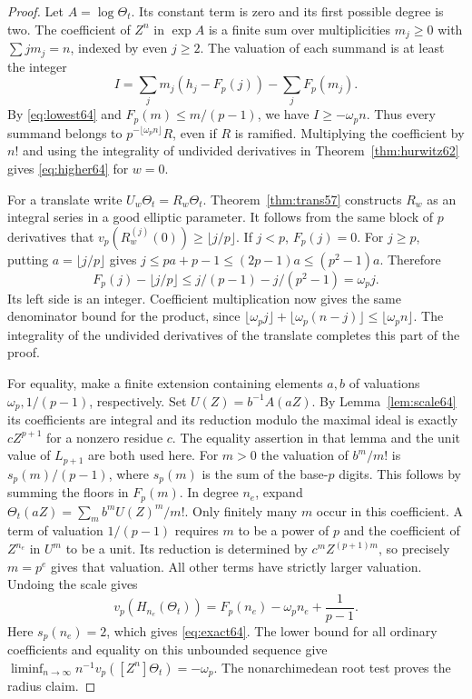 \documentclass[a4paper,11pt]{article}
\theoremstyle{definition}
\theoremstyle{remark}
\numberwithin{equation}{section}
\begin{document}
\begin{proof}
Let \(A=\log\Theta_t\). Its constant term is zero and its first
possible degree is two. The coefficient of \(Z^n\) in \(\exp A\)
is a finite sum over multiplicities \(m_j\ge0\) with
\(\sum j m_j=n\), indexed by even \(j\ge2\). The valuation of
each summand is at least the integer
\[
     I=\sum_j m_j(h_j-F_p(j))-\sum_j F_p(m_j).
\]
By \eqref{eq:lowest64} and \(F_p(m)\le m/(p-1)\), we have
\(I\ge-\omega_p n\). Thus every summand belongs to
\(p^{-\lfloor\omega_p n\rfloor}R\), even if \(R\) is ramified.
Multiplying the coefficient by \(n!\) and using the integrality
of undivided derivatives in Theorem~\ref{thm:hurwitz62} gives
\eqref{eq:higher64} for \(w=0\).

For a translate write \(U_w\Theta_t=R_w\Theta_t\).
Theorem~\ref{thm:trans57}
constructs \(R_w\) as an integral series in a good elliptic parameter.
It follows from the same block of \(p\) derivatives that
\(v_p(R_w^{(j)}(0))\ge\lfloor j/p\rfloor\).
If \(j<p\), \(F_p(j)=0\). For \(j\ge p\), putting \(a=\lfloor j/p\rfloor\)
gives \(j\le pa+p-1\le (2p-1)a\le(p^2-1)a\). Therefore
\[
 F_p(j)-\lfloor j/p\rfloor
       \le j/(p-1)-j/(p^2-1)=\omega_p j .
\]
Its left side is an integer. Coefficient multiplication now gives the
same denominator bound for the product, since
\(\lfloor\omega_p j\rfloor+\lfloor\omega_p(n-j)\rfloor
\le\lfloor\omega_p n\rfloor\). The integrality of the undivided
derivatives of the translate completes this part of the proof.

For equality, make a finite extension containing elements \(a,b\)
of valuations \(\omega_p,1/(p-1)\), respectively. Set
\(U(Z)=b^{-1}A(aZ)\). By Lemma~\ref{lem:scale64} its coefficients
are integral and its reduction modulo the maximal ideal is exactly
\(cZ^{p+1}\) for a nonzero residue \(c\). The equality assertion
in that lemma and the unit value of \(L_{p+1}\) are both used here.
For \(m>0\) the valuation of \(b^m/m!\) is
\(s_p(m)/(p-1)\), where \(s_p(m)\) is the sum of the base-\(p\)
digits. This follows by summing the floors in \(F_p(m)\).
In degree \(n_e\), expand \(\Theta_t(aZ)=\sum_m b^m U(Z)^m/m!\).
Only finitely many \(m\) occur in this coefficient.
A term of valuation \(1/(p-1)\) requires \(m\) to be a power of
\(p\) and the coefficient of \(Z^{n_e}\) in \(U^m\) to be a unit.
Its reduction is determined by \(c^mZ^{(p+1)m}\), so precisely
\(m=p^e\) gives that valuation. All other terms have strictly larger
valuation. Undoing the scale gives
\[
 v_p(H_{n_e}(\Theta_t))=F_p(n_e)-\omega_p n_e+\frac1{p-1}.
\]
Here \(s_p(n_e)=2\), which gives \eqref{eq:exact64}. The lower
bound for all ordinary coefficients and equality on this unbounded
sequence give \(\liminf_{n\to\infty}n^{-1}v_p([Z^n]\Theta_t)
=-\omega_p\). The nonarchimedean root test proves the radius claim.
\end{proof}
\end{document}
